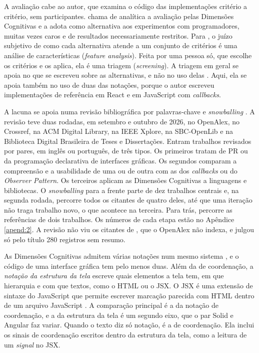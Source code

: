 A avaliação cabe ao autor, que examina o código das implementações critério
a critério, sem participantes.
\textcite[p. 8]{kiss2014} chama de analítica a avaliação pelas Dimensões
Cognitivas e a adota como alternativa aos experimentos com programadores,
muitas vezes caros e de resultados necessariamente restritos.
Para \textcite[p. 12]{kitchenham1996}, o juízo subjetivo de como cada
alternativa atende a um conjunto de critérios é uma análise de
características (\emph{feature analysis}).
Feita por uma pessoa só, que escolhe os critérios e os aplica, ela é uma
triagem (\emph{screening}).
A triagem em geral se apoia no que se escreveu sobre as alternativas, e não
no uso delas \cite[p. 15]{kitchenham1996}.
Aqui, ela se apoia também no uso de duas das notações, porque o autor
escreveu implementações de referência em React e em JavaScript com
\emph{callbacks}.

A lacuna se apoia numa revisão bibliográfica por palavras-chave e
\emph{snowballing} \cite[p. 3-4]{wohlin2014}.
A revisão teve duas rodadas, em setembro e outubro de 2026, no OpenAlex, no
Crossref, na ACM Digital Library, na IEEE Xplore, na SBC-OpenLib e na
Biblioteca Digital Brasileira de Teses e Dissertações.
Entram trabalhos revisados por pares, em inglês ou português, de três
tipos.
Os primeiros tratam de PR ou da programação declarativa de interfaces
gráficas.
Os segundos comparam a compreensão e a usabilidade de uma ou de outra com
as dos \emph{callbacks} ou do \emph{Observer Pattern}.
Os terceiros aplicam as Dimensões Cognitivas a linguagens e bibliotecas.
O \emph{snowballing} para a frente parte de dez trabalhos centrais e, na
segunda rodada, percorre todos os citantes de quatro deles, até que uma
iteração não traga trabalho novo, o que acontece na terceira.
Para trás, percorre as referências de dois trabalhos.
Os números de cada etapa estão no Apêndice \ref{apend:2}.
A revisão não viu os citantes de \textcite{kiss2014}, que o OpenAlex não
indexa, e julgou só pelo título 280 registros sem resumo.

As Dimensões Cognitivas admitem várias notações num mesmo sistema
\cite[p. 328]{blackwell2001}, e o código de uma interface gráfica tem pelo menos
duas.
Além da de coordenação, a \emph{notação da estrutura da tela} escreve quais elementos a tela
tem, em que hierarquia e com que textos, como o HTML ou o JSX.
O JSX é uma extensão de sintaxe do JavaScript que permite escrever
marcação parecida com HTML dentro de um arquivo JavaScript \cite{meta2026c}.
A comparação principal é a da notação de coordenação, e a da estrutura da
tela é um segundo eixo, que o par Solid e Angular faz variar.
Quando o texto diz só notação, é a de coordenação.
Ela inclui os sinais de coordenação escritos dentro da estrutura da tela,
como a leitura de um \emph{signal} no JSX.

